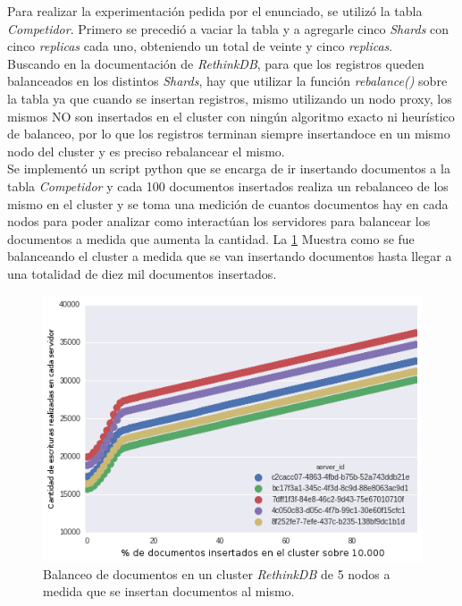 Para realizar la experimentación pedida por el enunciado, se utilizó la tabla \textit{Competidor}. Primero se precedió a vaciar la tabla y a agregarle cinco \textit{Shards} con cinco \textit{replicas} cada uno, obteniendo un total de veinte y cinco \textit{replicas}. \\

Buscando en la documentación de \textit{RethinkDB}, para que los registros queden balanceados en los distintos \textit{Shards}, hay que utilizar la función \textit{rebalance()} sobre la tabla ya que cuando se insertan registros, mismo utilizando un nodo proxy, los mismos NO son insertados en el cluster con ningún algoritmo exacto ni heurístico de balanceo, por lo que los registros terminan siempre insertandoce en un mismo nodo del cluster y es preciso rebalancear el mismo. \\

Se implementó un script python que se encarga de ir insertando documentos a la tabla \textit{Competidor} y cada 100 documentos insertados realiza un rebalanceo de los mismo en el cluster y se toma una medición de cuantos documentos hay en cada nodos para poder analizar como interactúan los servidores para balancear los documentos a medida que aumenta la cantidad. La \ref{fig: cluster} Muestra como se fue balanceando el cluster a medida que se van insertando documentos hasta llegar a una totalidad de diez mil documentos insertados. \\

\begin{figure}[H]
  \centering
    \includegraphics[scale=0.6]{../graficos/cluster.png}
  \caption{Balanceo de documentos en un cluster \textit{RethinkDB} de 5 nodos a medida que se insertan documentos al mismo.}
  \label{fig: cluster}
\end{figure}


